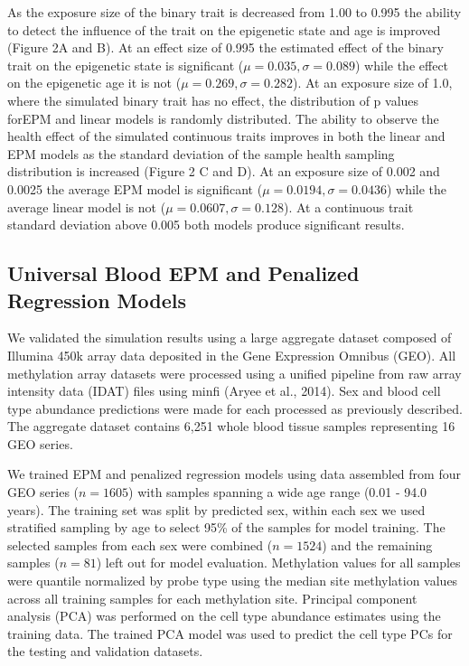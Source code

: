 \documentclass{article}
\begin{document}
{\begin{linenumbers}
As the exposure size of the binary trait is decreased from 1.00 to 0.995 the ability to detect the influence of the 
trait on the epigenetic state and age is improved (Figure 2A and B). At an effect size of 0.995 the estimated effect 
of the binary trait on the epigenetic state is significant ($\mu =0.035, \sigma=0.089$) while the effect on the 
epigenetic age it is not ($\mu=0.269, \sigma=0.282$). At an exposure size of 1.0, where the simulated binary trait 
has no effect, the distribution of p values forEPM and linear models is randomly distributed. The ability to observe 
the health effect of the simulated continuous traits improves in both the linear and EPM models as the standard 
deviation of the sample health sampling distribution is increased (Figure 2 C and D). At an exposure size of 0.002 
and 0.0025 the average EPM model is significant ($\mu=0.0194, \sigma=0.0436$) while the average linear model is not 
($\mu=0.0607, \sigma=0.128$). At a continuous trait standard deviation above 0.005 both models produce significant 
results. 

\subsection{Universal Blood EPM and Penalized Regression Models}

We validated the simulation results using a  large aggregate dataset composed of Illumina 450k array 
data\cite{Marabita2018-yi,Ventham2016-qj,Tan2014-ns,Johnson2020-vb,Voisin2015-ch,Soriano-Tarraga2016-tf,
Dabin_undated-pr,Horvath2015-af,Kurushima2019-gc,Zannas2019-bc,Braun2019-gp,Demetriou2013-jx,Tserel2015-qr} 
deposited in the Gene Expression Omnibus\cite{Barrett2012-gu} (GEO). All methylation array datasets were processed 
using a unified pipeline from raw array intensity data (IDAT) files using minfi (Aryee et al., 2014). Sex and blood 
cell type abundance predictions were made for each processed as previously described\cite{Houseman2012-rr,Aryee2014-ky}. 
The aggregate dataset contains 6,251 whole blood tissue samples representing 16 GEO series. 

We trained EPM and penalized regression models using data assembled from four GEO 
series\cite{Johansson2013-of,Liu2013-qo,Butcher2017-nr,Damaso2020-gd}  ($n=1605$) with samples spanning a wide age 
range (0.01 - 94.0 years). The training set was split by predicted sex, within each sex we used stratified sampling by 
age to select 95\% of the samples for model training. The selected samples from each sex were combined 
($n=1524$) and the remaining samples ($n=81$) left out for  model evaluation. Methylation values for all samples were 
quantile normalized by probe type\cite{Horvath2013-sk} using the median site methylation values across all training 
samples for each methylation site.  Principal component analysis (PCA) was performed on the cell type abundance 
estimates using the training data. The trained PCA model was used to predict the cell type PCs for the testing 
and validation datasets. 


\end{linenumbers}}
\end{document}
